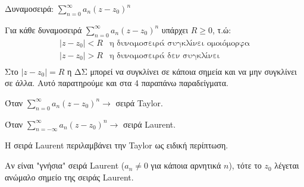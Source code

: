 \documentclass[12pt,a4paper,titlepage,fleqn]{article}
\begin{document}
  \begin{defn*}{}
  	Δυναμοσειρά: \( \displaystyle \sum_{n=0}^\infty a_n(z-z_0)^n \)
  \end{defn*}
  
  \begin{theorem*}{}
  	Για κάθε δυναμοσειρά \( \displaystyle \sum_{n=0}^\infty a_n(z-z_0)^n \) υπάρχει
  	\( R \geq 0 \), τ.ώ:
  	\[
  	\begin{array}{ll}
  	|z-z_0|<R & \text{η δυναμοσειρά συγκλίνει ομοιόμορφα} \\
  	|z-z_0|>R & \text{η δυναμοσειρά δεν συγκλίνει} \\
  	\end{array}
  	\]
  	Στο \( |z-z_0|=R \) η ΔΣ μπορεί να συγκλίνει σε κάποια σημεία και να μην
  	συγκλίνει σε άλλα. Αυτό παρατηρούμε και στα 4 παραπάνω παραδείγματα.
  \end{theorem*}
  
  Όταν \( \displaystyle \sum_{n=0}^\infty a_n(z-z_0)^n \rightarrow \) σειρά Taylor.
  
  Όταν \( \displaystyle \sum_{n=-\infty}^\infty a_n(z-z_0)^n \rightarrow \)
  σειρά Laurent.
  
  Η σειρά Laurent περιλαμβάνει την Taylor ως ειδική περίπτωση.
  
  Αν είναι "γνήσια" σειρά Laurent (\( a_n \neq 0 \) για κάποια αρνητικά \( n \)),
  τότε το \( z_0 \) λέγεται ανώμαλο σημείο της σειράς Laurent.
\end{document}
